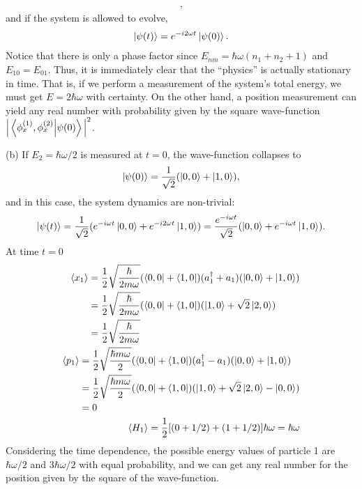 {\begin{eqnarray}
,\end{eqnarray}
and if the system is allowed to evolve,
\begin{eqnarray}
    \ket{\psi(t)} = e^{-i 2 \omega t} \ket{\psi(0)}
.\end{eqnarray}
Notice that there is only a phase factor since $E_{nm} = \hbar \omega (n_1 + n_2 + 1)$ and $E_{10} = E_{01}$.
Thus, it is immediately clear that the ``physics'' is actually stationary in time.
That is, if we perform a measurement of the system's total energy, we must get $E = 2 \hbar \omega$ with certainty.
On the other hand, a position measurement can yield any real number with probability given by the square wave-function $\Big|\bra{\phi_{x}^{(1)},\phi_{x}^{(2)}} \ket{\psi(0)} \Big|^2$.

(b) If $E_2 = \hbar \omega / 2$ is measured at $t = 0$, the wave-function collapses to
\begin{eqnarray}
    \ket{\psi(0)} = \frac{1}{\sqrt{2}} ( \ket{0,0} + \ket{1,0} )
,\end{eqnarray}
and in this case, the system dynamics are non-trivial:
\begin{eqnarray}
    \ket{\psi(t)} = \frac{1}{\sqrt{2}} ( e^{-i \omega t} \ket{0,0} + e^{-i 2 \omega t} \ket{1,0} ) = \frac{e^{-i\omega t}}{\sqrt{2}} ( \ket{0,0} + e^{-i \omega t} \ket{1,0} )
.\end{eqnarray}
At time $t = 0$
\begin{align}
\begin{aligned}
    \expval{x_1} &= \frac{1}{2} \sqrt{\frac{\hbar}{2 m \omega}} ( \bra{0,0} + \bra{1,0} ) (a^{\dagger}_{1} + a_{1}) ( \ket{0,0} + \ket{1,0} ) \\
               &= \frac{1}{2} \sqrt{\frac{\hbar}{2 m \omega}} ( \bra{0,0} + \bra{1,0} ) ( \ket{1,0} + \sqrt{2} \ket{2,0} ) \\
               &= \frac{1}{2} \sqrt{\frac{\hbar}{2 m \omega}}
\end{aligned}
\\
\begin{aligned}
    \expval{p_1} &= \frac{1}{2} \sqrt{\frac{\hbar m \omega}{2}} ( \bra{0,0} + \bra{1,0} ) (a^{\dagger}_{1} - a_1) ( \ket{0,0} + \ket{1,0} ) \\
                 &= \frac{1}{2} \sqrt{\frac{\hbar m \omega}{2}} ( \bra{0,0} + \bra{1,0} ) ( \ket{1,0} + \sqrt{2} \ket{2,0} - \ket{0,0} ) \\
                 &= 0
\end{aligned}
\\
\expval{H_1} = \frac{1}{2} [ ( 0 + 1/2 ) + (1 + 1/2) ] \hbar \omega = \hbar \omega
\end{align}
Considering the time dependence, the possible energy values of particle 1 are $\hbar \omega / 2$ and $3 \hbar \omega / 2$ with equal probability, and we can get any real number for the position given by the square of the wave-function.

}


